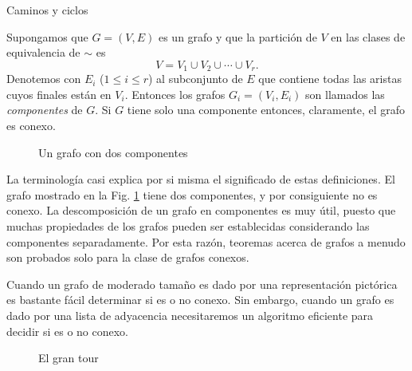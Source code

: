 \begin{section}{Caminos y ciclos}
\begin{definicion}Supongamos que $G=(V,E)$ es un grafo y que la partición de $V$ en las clases de equivalencia de $\sim$ es
$$
V= V_1 \cup V_2 \cup \cdots \cup V_r.
$$
Denotemos con $E_i$ ($1\le i \le r$) al subconjunto de $E$ que contiene todas las aristas cuyos finales están en $V_i$. Entonces los grafos $G_i=(V_i,E_i)$ son llamados las \textit{componentes}     de $G$. Si $G$ tiene solo una componente entonces, claramente, el grafo es {conexo}.
\end{definicion}

\begin{figure}[t]
    \begin{center}
\end{center}
\caption{Un grafo con dos componentes} \label{f5.6}
\end{figure}

La terminología casi explica por si misma el significado de estas definiciones. El grafo mostrado en la Fig. \ref{f5.6} tiene dos componentes, y por consiguiente no es conexo. La descomposición de un grafo en componentes es muy útil, puesto que muchas propiedades de los grafos pueden ser establecidas considerando las componentes separadamente. Por esta razón, teoremas acerca de grafos a menudo son probados solo para la clase de grafos conexos.

Cuando un grafo de moderado tamaño es dado por una representación pictórica es bastante fácil determinar si es o no conexo. Sin embargo, cuando un grafo es dado por una lista de adyacencia necesitaremos un algoritmo eficiente para decidir si es o no conexo. 

\begin{figure}[b]
    \begin{center}
    \end{center}
    \caption{El gran tour} \label{f5.7}
\end{figure}


\end{section}
